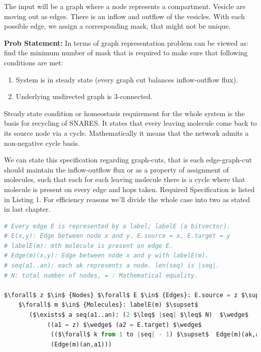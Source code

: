 \documentclass[preprint,12pt]{elsarticle}
\begin{document}
The input will be a graph where a node represents a compartment. Vesicle are moving out as edges. There is an inflow and outflow of the vesicles. With each possible edge, we assign a corresponding mask, that might not be unique. 

\textbf{Prob Statement:} In terms of graph representation problem can be viewed as: find the minimum number of mask that is required to make sure that following conditions are met:
\begin{enumerate}
\item System is in steady state (every graph cut balances inflow-outflow flux).
\item Underlying undirected graph is 3-connected.
\end{enumerate}

Steady state condition or homeostasis requirement for the whole system is the basis for recycling of SNARES. It states that every leaving molecule come back to its source node via a cycle. Mathematically it means that the network admits a non-negative cycle basis. 

We can state this specification regarding graph-cuts, that is each edge-graph-cut should maintain the inflow-outflow flux or as a property of assignment of molecules, such that each for each leaving molecule there is a cycle where that molecule is present on every edge and hops taken. Required Specification is listed in Listing 1. For efficiency reasons we'll divide the whole case into two as stated in last chapter.

\begin{lstlisting}[language=Python,
mathescape,
 breaklines,
  rulecolor=\color{black},
  frame=single,
  caption= \textbf{Steady state specification.}
]
# Every edge E is represented by a label; labelE (a bitvector).
# E(x,y): Edge between node x and y. E.source = x, E.target = y    
# labelE(m): mth molecule is present on edge E.
# Edge(m)(x,y): Edge between node x and y with labelE(m).                 
# seq(a1..an): each ak represents a node. len(seq) is |seq|.
# N: total number of nodes, = : Mathematical equality.
 
$\forall$ z $\in$ {Nodes} $\forall$ E $\in$ {Edges}: E.source = z $\supset$
    $\forall$ m $\in$ {Molecules}: labelE(m) $\supset$
       ($\exists$ a seq(a1..an): (2 $\leq$ |seq| $\leq$ N)  $\wedge$
            ((a1 = z) $\wedge$ (a2 = E.target) $\wedge$
             (($\forall$ k from 1 to |seq| - 1) $\supset$  Edge(m)(ak,ak+1)) $\wedge$
             (Edge(m)(an,a1)))

\end{lstlisting}
\end{document}

